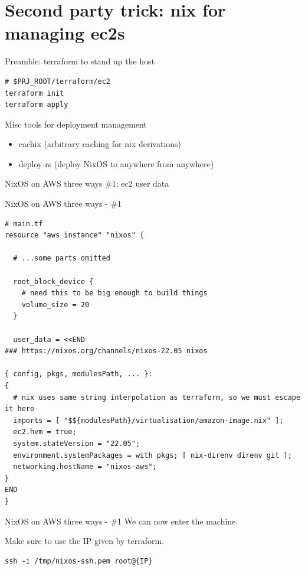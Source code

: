 \documentclass[bigger]{beamer}
\begin{document}
\section{Second party trick: nix for managing ec2s}
\label{sec:orgd235d8e}
\begin{frame}[label={sec:org39a5c10},fragile]{Preamble: terraform to stand up the host}
 \begin{verbatim}
# $PRJ_ROOT/terraform/ec2
terraform init
terraform apply
\end{verbatim}
\end{frame}
\begin{frame}[label={sec:org73256d4}]{Misc tools for deployment management}
\begin{itemize}
\item cachix (arbitrary caching for nix derivations)
\item deploy-rs (deploy NixOS to anywhere from anywhere)
\end{itemize}
\end{frame}
\begin{frame}[label={sec:org27fd3e0}]{NixOS on AWS three ways}
\#1: ec2 user data
\end{frame}
\begin{frame}[label={sec:org5e0a5f0},fragile]{NixOS on AWS three ways - \#1}
 \tiny
\begin{verbatim}
# main.tf
resource "aws_instance" "nixos" {

  # ...some parts omitted

  root_block_device {
    # need this to be big enough to build things
    volume_size = 20
  }

  user_data = <<END
### https://nixos.org/channels/nixos-22.05 nixos

{ config, pkgs, modulesPath, ... }:
{
  # nix uses same string interpolation as terraform, so we must escape it here
  imports = [ "$${modulesPath}/virtualisation/amazon-image.nix" ];
  ec2.hvm = true;
  system.stateVersion = "22.05";
  environment.systemPackages = with pkgs; [ nix-direnv direnv git ];
  networking.hostName = "nixos-aws";
}
END
}
\end{verbatim}
\end{frame}
\begin{frame}[label={sec:org0be7cb1},fragile]{NixOS on AWS three ways - \#1}
 We can now enter the machine.

Make sure to use the IP given by terraform.

\begin{verbatim}
ssh -i /tmp/nixos-ssh.pem root@{IP}
\end{verbatim}
\end{frame}
\end{document}

